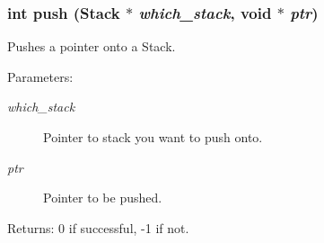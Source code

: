\subsubsection{\setlength{\rightskip}{0pt plus 5cm}int push (\bf{Stack} $\ast$ {\em which\_\-stack}, void $\ast$ {\em ptr})}\label{stack_8c_8dc04abc21a21e589ab50c53d14085cc}


Pushes a pointer onto a Stack. \begin{Desc}
\item[Parameters:]
\begin{description}
\item[{\em which\_\-stack}]Pointer to stack you want to push onto. \item[{\em ptr}]Pointer to be pushed. \end{description}
\end{Desc}
\begin{Desc}
\item[Returns:]0 if successful, -1 if not. \end{Desc}
